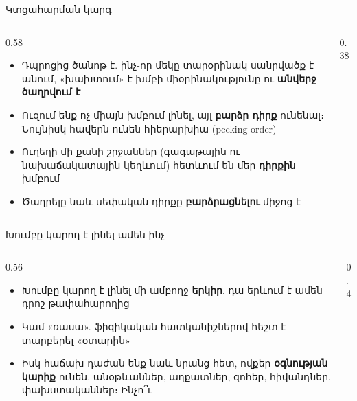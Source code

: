 \begin{frame}{Կտցահարման կարգ}
  \begin{columns}[c]
    \begin{column}{0.58\textwidth}
      \begin{itemize}
        \item Դպրոցից ծանոթ է. ինչ-որ մեկը տարօրինակ սանրվածք է անում, «խախտում» է խմբի միօրինակությունը ու \textbf{անվերջ ծաղրվում է}
        \item<2-> Ուզում ենք ոչ միայն խմբում լինել, այլ \textbf{բարձր դիրք} ունենալ։ Նույնիսկ հավերն ունեն հիերարխիա (pecking order)
        \item<3-> Ուղեղի մի քանի շրջաններ (գագաթային ու նախաճակատային կեղևում) հետևում են մեր \textbf{դիրքին} խմբում
        \item<4-> Ծաղրելը նաև սեփական դիրքը \textbf{բարձրացնելու} միջոց է
      \end{itemize}
    \end{column}
    \begin{column}{0.38\textwidth}
      \centering
      \ \par\medskip
    \end{column}
  \end{columns}
\end{frame}

\begin{frame}{Խումբը կարող է լինել ամեն ինչ}
  \begin{columns}[T]
    \begin{column}{0.56\textwidth}
      \begin{itemize}
        \item Խումբը կարող է լինել մի ամբողջ \textbf{երկիր}. դա երևում է ամեն դրոշ թափահարողից
        \item<2-> Կամ «ռասա». ֆիզիկական հատկանիշներով հեշտ է տարբերել «օտարին»
        \item<4-> Իսկ հաճախ դաժան ենք նաև նրանց հետ, ովքեր \textbf{օգնության կարիք} ունեն. անօթևաններ, աղքատներ, զոհեր, հիվանդներ, փախստականներ։ Ինչո՞ւ
      \end{itemize}
    \end{column}
    \begin{column}{0.4\textwidth}
    \end{column}
  \end{columns}
\end{frame}


